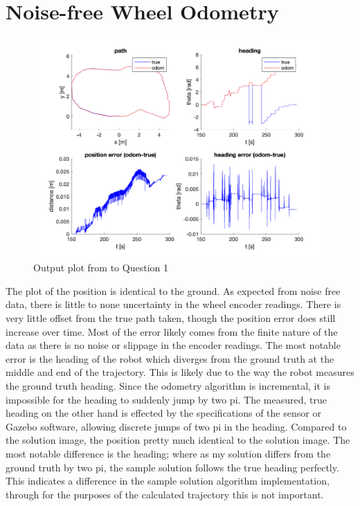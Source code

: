 \documentclass{article} %
\begin{document}
{} %

\section{Noise-free Wheel Odometry} %
\begin{figure}[hbt]
  \centering
    \includegraphics[width=1.0\textwidth]{ass1_q1.png}
  \caption{Output plot from to Question 1}
\end{figure}

The plot of the position is identical to the ground. As expected from noise free data, there is little to none uncertainty in the wheel encoder readings. There is very little offset from the true path taken, though the position error does still increase over time. Most of the error likely comes from the finite nature of the data as there is no noise or slippage in the encoder readings.
The most notable error is the heading of the robot which diverges from the ground truth at the middle and end of the trajectory. This is likely due to the way the robot measures the ground truth heading.
Since the odometry algorithm is incremental, it is impossible for the heading to suddenly jump by two pi. The measured, true heading on the other hand is effected by the specifications of the sensor or Gazebo software, allowing discrete jumps of two pi in the heading.
Compared to the solution image, the position pretty much identical to the solution image. The most notable difference is the heading; where as my solution differs from the ground truth by two pi, the sample solution follows the true heading perfectly. This indicates a difference in the sample solution algorithm implementation, through for the purposes of the calculated trajectory this is not important.
\end{document}
